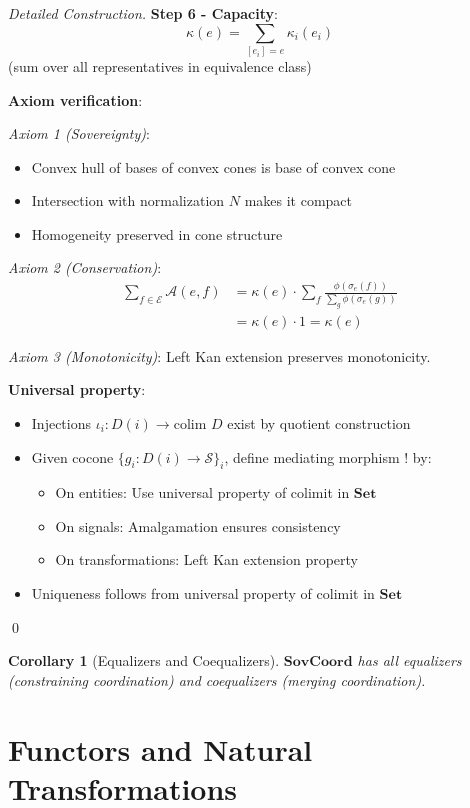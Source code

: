 \documentclass[11pt,a4paper]{article}
\newtheorem{corollary}[theorem]{Corollary}
\theoremstyle{definition}
\theoremstyle{remark}
\newcommand{\E}{\mathcal{E}}
\newcommand{\A}{\mathcal{A}}
\newcommand{\SovCoord}{\mathbf{SovCoord}}
\begin{document}
\begin{proof}[Detailed Construction]
\textbf{Step 6 - Capacity}:
\[ \kappa(e) = \sum_{[e_i]=e} \kappa_i(e_i) \]
(sum over all representatives in equivalence class)

\textbf{Axiom verification}:

\textit{Axiom 1 (Sovereignty)}: 
\begin{itemize}
\item Convex hull of bases of convex cones is base of convex cone
\item Intersection with normalization $N$ makes it compact
\item Homogeneity preserved in cone structure
\end{itemize}

\textit{Axiom 2 (Conservation)}:
\begin{align*}
\sum_{f \in \E} \A(e,f) &= \kappa(e) \cdot \sum_f \frac{\phi(\sigma_e(f))}{\sum_g \phi(\sigma_e(g))} \\
&= \kappa(e) \cdot 1 = \kappa(e)
\end{align*}

\textit{Axiom 3 (Monotonicity)}: Left Kan extension preserves monotonicity.

\textbf{Universal property}: 
\begin{itemize}
\item Injections $\iota_i: D(i) \to \text{colim } D$ exist by quotient construction
\item Given cocone $\{g_i: D(i) \to \mathcal{S}\}_i$, define mediating morphism $!$ by:
  \begin{itemize}
  \item On entities: Use universal property of colimit in $\mathbf{Set}$
  \item On signals: Amalgamation ensures consistency
  \item On transformations: Left Kan extension property
  \end{itemize}
\item Uniqueness follows from universal property of colimit in $\mathbf{Set}$
\end{itemize}

\qed
\end{proof}

\begin{corollary}[Equalizers and Coequalizers]
$\SovCoord$ has all equalizers (constraining coordination) and coequalizers (merging coordination).
\end{corollary}

\section{Functors and Natural Transformations}
\end{document}
